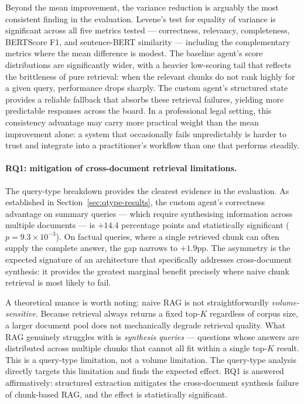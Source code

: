Beyond the mean improvement, the variance reduction is arguably the most consistent
finding in the evaluation. Levene's test for equality of variance is significant across
all five metrics tested --- correctness, relevancy, completeness, BERTScore F1, and
sentence-BERT similarity --- including the complementary metrics where the mean
difference is modest. The baseline agent's score distributions are significantly wider,
with a heavier low-scoring tail that reflects the brittleness of pure retrieval: when
the relevant chunks do not rank highly for a given query, performance drops sharply.
The custom agent's structured state provides a reliable fallback that absorbs these
retrieval failures, yielding more predictable responses across the board. In a
professional legal setting, this consistency advantage may carry more practical weight
than the mean improvement alone: a system that occasionally fails unpredictably is
harder to trust and integrate into a practitioner's workflow than one that performs
steadily.

\paragraph{RQ1: mitigation of cross-document retrieval limitations.}
The query-type breakdown provides the clearest evidence in the evaluation. As
established in Section~\ref{sec:qtype-results}, the custom agent's correctness
advantage on summary queries --- which require synthesising information across
multiple documents --- is $+14.4$ percentage points and statistically significant
($p = 9.3 \times 10^{-3}$). On factual queries, where a single retrieved chunk can
often supply the complete answer, the gap narrows to $+1.9$pp. The asymmetry is
the expected signature of an architecture that specifically addresses cross-document
synthesis: it provides the greatest marginal benefit precisely where naive chunk
retrieval is most likely to fail.

A theoretical nuance is worth noting: naive RAG is not straightforwardly
\emph{volume-sensitive}. Because retrieval always returns a fixed top-$K$ regardless
of corpus size, a larger document pool does not mechanically degrade retrieval
quality. What RAG genuinely struggles with is \emph{synthesis queries} --- questions
whose answers are distributed across multiple chunks that cannot all fit within a
single top-$K$ result. This is a query-type limitation, not a volume limitation.
The query-type analysis directly targets this limitation and finds the expected
effect. RQ1 is answered affirmatively: structured extraction mitigates the
cross-document synthesis failure of chunk-based RAG, and the effect is
statistically significant.

